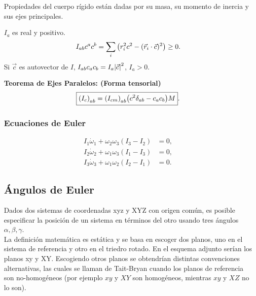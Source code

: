 \begin{tcolorbox}
	Propiedades del cuerpo rígido están dadas por su masa, su momento de inercia y sus ejes principales.
\end{tcolorbox}

$I_a$ es real y positivo.
\begin{equation}
	I_{ab} c^a c^b = \sum _i \qty(r_i ^2 c^2 - (\vec{r}_i \cdot \vec{c})^2) \geq 0.
\end{equation}
Si $\vec{c}$ es autovector de $I$, $I_{ab} c_a c_b = I_a \abs{\vec{c}}^2$, $I_a > 0$.

\begin{teorema}
	\textbf{Teorema de Ejes Paralelos: (Forma tensorial)}
	\begin{equation}
		\boxed{ \qty(I_c)_{ab} = \qty(I_{cm})_{ab} \qty(c^2 \delta _{ab} - c_a c_b)M }.
	\end{equation}
\end{teorema}


\subsubsection{Ecuaciones de Euler}
\begin{align*}
	I_1 \dot{\omega}_1 + \omega _2 \omega _3 (I_3 - I_2) &= 0, \\
	I_2 \dot{\omega}_2 + \omega _1 \omega _3 (I_1 - I_3) &= 0, \\
	I_3 \dot{\omega}_3 + \omega _1 \omega _2 (I_2 - I_1) &= 0.
\end{align*}




\subsection{Ángulos de Euler}

Dados dos sistemas de coordenadas xyz y XYZ con origen común, es posible especificar la posición de un sistema en términos del otro usando tres ángulos $\alpha, \beta, \gamma$. \\

La definición matemática es estática y se basa en escoger dos planos, uno en el sistema de referencia y otro en el triedro rotado. En el esquema adjunto serían los planos xy y XY. Escogiendo otros planos se obtendrían distintas convenciones alternativas, las cuales se llaman de Tait-Bryan cuando los planos de referencia son no-homogéneos (por ejemplo $xy$ y $XY$ son homogéneos, mientras $xy$ y $XZ$ no lo son). \\


